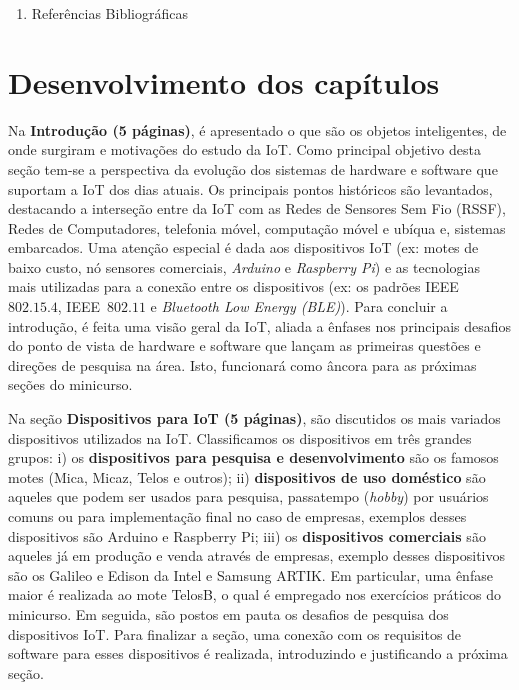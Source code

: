 \documentclass{SBCbookchapter}
\begin{document}
\begin{enumerate}
  \item Referências Bibliográficas
\end{enumerate}


\section{Desenvolvimento dos capítulos}

Na \textbf{Introdução (5 páginas)}, é apresentado o que 
são os objetos inteligentes, de onde surgiram e motivações do estudo da IoT. 
Como principal objetivo desta seção tem-se a perspectiva da evolução dos 
sistemas de hardware e software que suportam a IoT dos dias atuais. Os 
principais pontos históricos são levantados, destacando a interseção entre da 
IoT com as Redes de Sensores Sem Fio (RSSF), Redes de Computadores, telefonia 
móvel, computação móvel e ubíqua e, sistemas embarcados. Uma atenção especial é 
dada aos dispositivos IoT (ex: motes de baixo custo, nó sensores comerciais, 
\textit{Arduino} e \textit{Raspberry Pi}) e  as tecnologias mais utilizadas para 
a conexão entre os dispositivos (ex: os padrões IEEE~$802.15.4$, IEEE~$802.11$ e 
\textit{Bluetooth Low Energy (BLE)}). Para concluir a introdução, é feita uma 
visão geral da IoT, aliada a ênfases nos principais desafios do ponto 
de vista de hardware e software que lançam as primeiras questões e direções de 
pesquisa na área. Isto, funcionará como âncora para as próximas seções do 
minicurso.


Na seção \textbf{Dispositivos para IoT (5 páginas)}, são 
discutidos os mais variados dispositivos utilizados na IoT. Classificamos os 
dispositivos em três grandes grupos: i) os \textbf{dispositivos para pesquisa e 
desenvolvimento} são os famosos motes (Mica, Micaz, Telos e outros); ii) 
\textbf{dispositivos de uso doméstico} são aqueles que podem ser usados para 
pesquisa, passatempo (\textit{hobby}) por usuários comuns ou para implementação 
final no caso de empresas, exemplos desses dispositivos são Arduino e 
Raspberry Pi; iii) os \textbf{dispositivos comerciais} são aqueles já em 
produção e venda através de empresas, exemplo desses dispositivos são os Galileo 
e Edison da Intel e Samsung ARTIK.  Em particular, uma ênfase maior é 
realizada ao mote TelosB, o qual é empregado nos exercícios práticos do 
minicurso. Em seguida, são postos em pauta os desafios de pesquisa dos 
dispositivos IoT. Para finalizar a seção, uma conexão com os requisitos de 
software para esses dispositivos é realizada, introduzindo e justificando a 
próxima seção.
\end{document}
